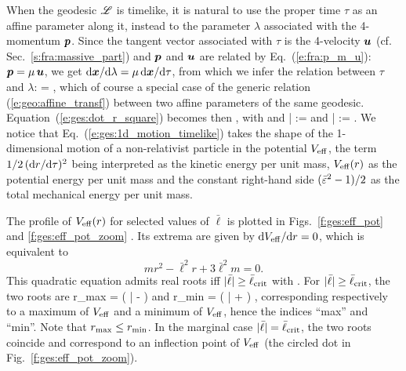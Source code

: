 When the geodesic $\mathscr{L}$ is timelike, it is natural to use the proper time $\tau$
as an affine parameter along it, instead to the parameter $\lambda$ associated
with the 4-momentum $\bm{p}$. Since the tangent vector associated with $\tau$
is the 4-velocity $\bm{u}$ (cf. Sec.~\ref{s:fra:massive_part}) and $\bm{p}$ and $\bm{u}$ are related by
Eq.~(\ref{e:fra:p_m_u}): $\bm{p} = \mu \, \bm{u}$, we get
$\mathrm{d}\bm{x}/\mathrm{d}\lambda = \mu \, \mathrm{d}\bm{x}/\mathrm{d}\tau$, from which we infer the relation
between $\tau$ and $\lambda$:
\be
    \tau = \mu \lambda ,
\ee
which of course a special case of the generic relation (\ref{e:geo:affine_transf})
between two affine parameters of the same geodesic.
Equation~(\ref{e:ges:dot_r_square}) becomes then
\be \label{e:ges:1d_motion_timelike}
     ,
\ee
with
\be \label{e:ges:V_eff_timelike}
\ee
and
\be
   \bar{\veps} := \frac{\veps}{\mu} \qquad\mbox{and}\qquad
   \bar{\ell} :=  \frac{\ell}{\mu} .
\ee
We notice that Eq.~(\ref{e:ges:1d_motion_timelike}) takes the shape of
the 1-dimensional motion of a non-relativist particle in the potential
$V_{\rm eff}$, the term $1/2 \, (\mathrm{d} r/\mathrm{d}\tau)^2$ being interpreted as
the kinetic energy per unit mass, $V_{\rm eff}(r)$ as the potential
energy per unit mass and the constant right-hand side $(\bar{\varepsilon}^2-1)/2$ as the total
mechanical energy per unit mass.

The profile  of $V_{\rm eff}(r)$ for selected values of $\bar{\ell}$ is
plotted in Figs.~\ref{f:ges:eff_pot} and \ref{f:ges:eff_pot_zoom} .
Its extrema are given by
$\mathrm{d} V_{\rm eff}/\mathrm{d} r=0$, which is equivalent to
\[
    m r^2 - \bar{\ell}^2 r + 3 \bar{\ell}^2 m = 0 .
\]
This quadratic equation admits real roots iff $|\bar{\ell}| \geq \bar{\ell}_{\rm crit}$
with
\be \label{e:ges:ell_crit}
   .
\ee
For $|\bar{\ell}| \geq \bar{\ell}_{\rm crit}$, the two roots are
\be
    r_{\rm max} =  \left( \bar{\ell} -
     \right)
    \qquad\mbox{and}\qquad
    r_{\rm min} =  \left( \bar{\ell} +
     \right) ,
\ee
corresponding respectively to a maximum of $V_{\rm eff}$ and a minimum
of $V_{\rm eff}$, hence the indices ``max'' and ``min''. Note that
$r_{\rm max} \leq r_{\rm min}$.
In the marginal case $|\bar{\ell}| = \bar{\ell}_{\rm crit}$, the two roots
coincide and correspond to an inflection point of $V_{\rm eff}$ (the circled
dot in Fig.~\ref{f:ges:eff_pot_zoom}).

